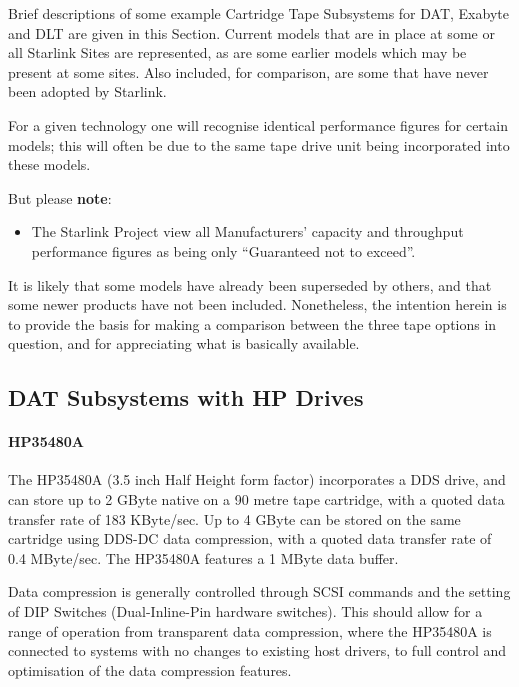Brief descriptions of some example Cartridge Tape Subsystems for DAT,
Exabyte and DLT are given in this Section. Current models that are in place at
some or all Starlink Sites are represented, as are some earlier models which
may be present at some sites. Also included, for comparison, are some that have
never been adopted by Starlink.

For a given technology one will recognise identical performance figures
for certain models; this will often be due to the same tape drive unit being
incorporated into these models.

But please {\bf note}:
\begin {itemize}

\item[{\LARGE\bf $\star$}] The Starlink Project view all Manufacturers' capacity
and throughput performance figures as being only ``Guaranteed not to exceed''.

\end {itemize}
It is likely that some models have already been superseded by others, and
that some newer products have not been included. Nonetheless, the intention
herein is to provide the basis for making a comparison between the three
tape options in question, and for appreciating what is basically available.

\subsection {DAT Subsystems with HP Drives}

\paragraph {HP35480A}

The HP35480A (3.5 inch Half Height form factor) incorporates a DDS drive, and
can store up to 2 GByte native on a 90 metre tape cartridge, with a quoted data
transfer rate of 183 KByte/sec. Up to 4 GByte can be stored on the same
cartridge using DDS-DC data compression, with a quoted data transfer rate of
0.4 MByte/sec. The HP35480A features a 1 MByte data buffer.

Data compression is generally controlled through SCSI commands and the setting
of DIP Switches (Dual-Inline-Pin hardware switches). This should allow for a
range of operation from transparent data compression, where the HP35480A is
connected to systems with no changes to existing host drivers, to full control
and optimisation of the data compression features.

